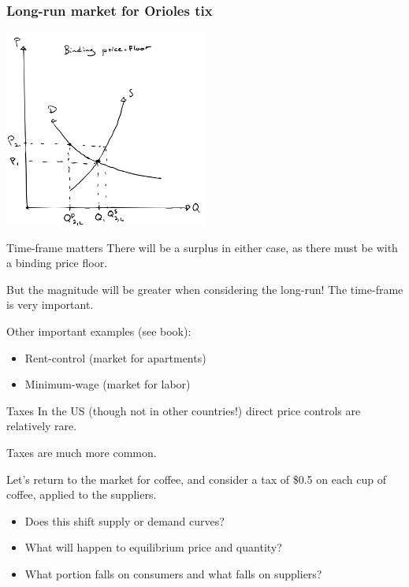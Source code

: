 \documentclass[aspectratio=169]{beamer}
\begin{document}
\begin{frame}
    \frametitle{Long-run market for Orioles tix}
    \centering
    \includegraphics[width = 0.5\textwidth,keepaspectratio]{Orioles_floor_long.png}
\end{frame}

\begin{frame}{Time-frame matters}
    There will be a surplus in either case, as there must be with a binding price floor.

    \vspace{5mm}

    But the magnitude will be greater when considering the long-run! The time-frame is very important.

    \vspace{5mm}

    Other important examples (see book):
    \begin{itemize}
        \item Rent-control (market for apartments)
        \item Minimum-wage (market for labor)
    \end{itemize}
\end{frame}

\begin{frame}{Taxes}
    In the US (though not in other countries!) direct price controls are relatively rare.

    \vspace{5mm}

    Taxes are much more common.

    \vspace{5mm}

    Let's return to the market for coffee, and consider a tax of \$0.5 on each cup of coffee, applied to the suppliers.

    \begin{itemize}
        \item Does this shift supply or demand curves?
        \item What will happen to equilibrium price and quantity?
        \item What portion falls on consumers and what falls on suppliers?
    \end{itemize}
\end{frame}
\end{document}
